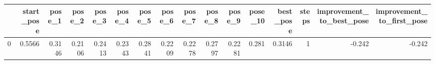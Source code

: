 \begin{tabular}{lrrrrrrrrrrrrrrr}
\toprule
{} &  start\_pose &  pose\_1 &  pose\_2 &  pose\_3 &  pose\_4 &  pose\_5 &  pose\_6 &  pose\_7 &  pose\_8 &  pose\_9 &  pose\_10 &  best\_pose &  steps &  improvement\_to\_best\_pose &  improvement\_to\_first\_pose \\
\midrule
0 &      0.5566 &  0.3146 &  0.2106 &  0.2413 &  0.2343 &  0.2841 &  0.2209 &  0.2278 &  0.2797 &  0.2281 &    0.281 &     0.3146 &      1 &                    -0.242 &                     -0.242 \\
\bottomrule
\end{tabular}
